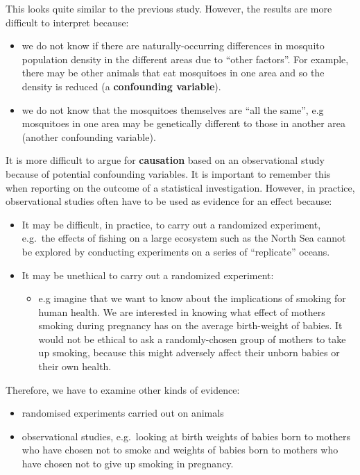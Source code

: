 \documentclass[
  oneside]{krantz}
\providecommand{\tightlist}{%
  \setlength{\itemsep}{0pt}\setlength{\parskip}{0pt}}
\begin{document}
This looks quite similar to the previous study. However, the results are more difficult to interpret because:

\begin{itemize}
\item
  we do not know if there are naturally-occurring differences in mosquito population density in the different areas due to ``other factors''. For example, there may be other animals that eat mosquitoes in one area and so the density is reduced (a \textbf{confounding variable}).
\item
  we do not know that the mosquitoes themselves are ``all the same'', e.g mosquitoes in one area may be genetically different to those in another area (another confounding variable).
\end{itemize}

It is more difficult to argue for \textbf{causation} based on an observational study because of potential confounding variables. It is important to remember this when reporting on the outcome of a statistical investigation. However, in practice, observational studies often have to be used as evidence for an effect because:

\begin{itemize}
\item
  It may be difficult, in practice, to carry out a randomized experiment, e.g.~the effects of fishing on a large ecosystem such as the North Sea cannot be explored by conducting experiments on a series of ``replicate'' oceans.
\item
  It may be unethical to carry out a randomized experiment:

  \begin{itemize}
  \tightlist
  \item
    e.g imagine that we want to know about the implications of smoking for human health. We are interested in knowing what effect of mothers smoking during pregnancy has on the average birth-weight of babies. It would not be ethical to ask a randomly-chosen group of mothers to take up smoking, because this might adversely affect their unborn babies or their own health.
  \end{itemize}
\end{itemize}

Therefore, we have to examine other kinds of evidence:

\begin{itemize}
\tightlist
\item
  randomised experiments carried out on animals
\item
  observational studies, e.g.~looking at birth weights of babies born to mothers who have chosen not to smoke and weights of babies born to mothers who have chosen not to give up smoking in pregnancy.
\end{itemize}
\end{document}
